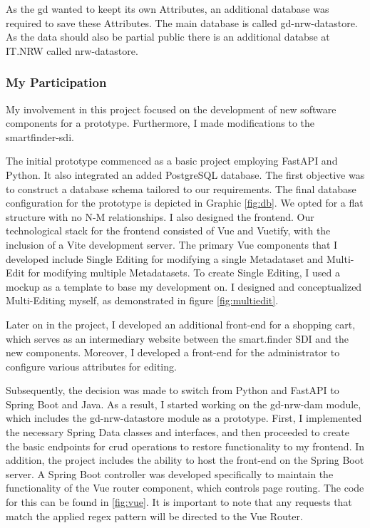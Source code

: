 \documentclass[11pt, titlepage, a4paper]{article}
\begin{document}

As the \gls{gd}  wanted to keept its own Attributes, an additional database was required to save these Attributes. The main database is called gd-nrw-datastore. As the data should also be partial public there is an additional databse at IT.NRW called nrw-datastore. %



\subsubsection{My Participation}
My involvement in this project focused on the development of new software components for a prototype. Furthermore, I made modifications to the smartfinder-sdi.



The initial prototype commenced as a basic project employing FastAPI and Python. It also integrated an added PostgreSQL database. The first objective was to construct a database schema tailored to our requirements. The final database configuration for the prototype is depicted in Graphic \ref{fig:db}. We opted for a flat structure with no N-M relationships.
I also designed the frontend. Our technological stack for the frontend consisted of Vue and Vuetify, with the inclusion of a Vite development server. The primary Vue components that I developed include Single Editing for modifying a single Metadataset and Multi-Edit for modifying multiple Metadatasets. To create Single Editing, I used a mockup as a template to base my development on. I designed and conceptualized Multi-Editing myself, as demonstrated in figure \ref{fig:multiedit}.

Later on in the project, I developed an additional front-end for a shopping cart, which serves as an intermediary website between the smart.finder SDI and the new components. Moreover, I developed a front-end for the administrator to configure various attributes for editing.




Subsequently, the decision was made to switch from Python and FastAPI to Spring Boot and Java. As a result, I started working on the gd-nrw-dam module, which includes the gd-nrw-datastore module as a prototype. First, I implemented the necessary Spring Data classes and interfaces, and then proceeded to create the basic endpoints for \gls{crud} operations to restore functionality to my frontend. In addition, the project includes the ability to host the front-end on the Spring Boot server. A Spring Boot controller was developed specifically to maintain the functionality of the Vue router component, which controls page routing. The code for this can be found in
\ref{fig:vue}. It is important to note that any requests that match the applied regex pattern will be directed to the Vue Router.
\end{document}
